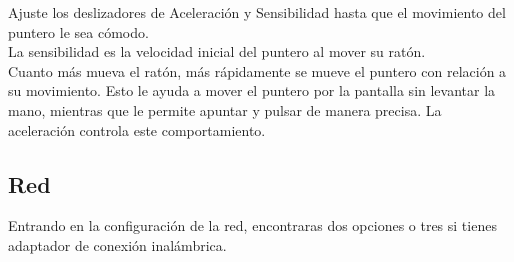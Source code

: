 \begin{itemize}
\begin{itemize}
Ajuste los deslizadores de Aceleración y Sensibilidad hasta que el movimiento del puntero le sea cómodo.\\

La sensibilidad es la velocidad inicial del puntero al mover su ratón.\\
Cuanto más mueva el ratón, más rápidamente se mueve el puntero con relación a su movimiento. Esto le ayuda a mover el puntero por la pantalla sin levantar la mano, mientras que le permite apuntar y pulsar de manera precisa. La aceleración controla este comportamiento.
\end{itemize}
\end{itemize}
\subsection{Red}
Entrando en la configuración de la red, encontraras dos opciones o tres si tienes adaptador de conexión inalámbrica.
